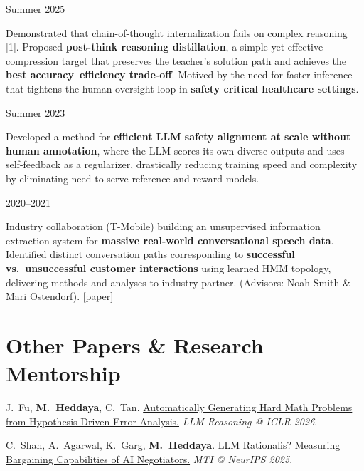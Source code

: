 \documentclass[11pt,letterpaper]{article}
\begin{document}
\vspace{4pt}
 \hfill Summer 2025
\begin{cvitems}
    \item Demonstrated that chain-of-thought internalization fails on complex reasoning [1]. Proposed \textbf{post-think reasoning distillation}, a simple yet effective compression target that preserves the teacher's solution path and achieves the \textbf{best accuracy--efficiency trade-off}. Motived by the need for faster inference that tightens the human oversight loop in \textbf{safety critical healthcare settings}.
\end{cvitems}

\vspace{4pt}
 \hfill Summer 2023
\begin{cvitems}
    \item Developed a method for \textbf{efficient LLM safety alignment at scale without human annotation}, where the LLM scores its own diverse outputs and uses self-feedback as a regularizer, drastically reducing training speed and complexity by eliminating need to serve reference and reward models.
\end{cvitems}


\break
{} \hfill 2020--2021
\begin{cvitems}
    \item Industry collaboration (T-Mobile) building an unsupervised information extraction system for 
    \textbf{massive real-world conversational speech data}. Identified distinct conversation paths corresponding to \textbf{successful vs.\ unsuccessful customer interactions} using learned HMM topology, delivering methods and analyses to industry partner. (Advisors: Noah Smith \& Mari Ostendorf). \href{https://aclanthology.org/2022.findings-emnlp.415/}{[paper]}
\end{cvitems}

\section*{Other Papers \& Research Mentorship}

\begin{cvitems}
    \item J.\ Fu, \textbf{M.\ Heddaya}, C.\ Tan. \href{https://openreview.net/forum?id=d1PcXKaAON}{Automatically Generating Hard Math Problems from Hypothesis-Driven Error Analysis.} \textit{LLM Reasoning @ ICLR 2026}.
    \item C.\ Shah, A.\ Agarwal, K.\ Garg, \textbf{M.\ Heddaya}. \href{https://neurips.cc/virtual/2025/loc/san-diego/128019}{LLM Rationalis? Measuring Bargaining Capabilities of AI Negotiators.} \textit{MTI @ NeurIPS 2025}.
\end{cvitems}
\end{document}
